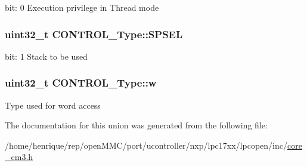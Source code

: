 bit\-: 0 Execution privilege in Thread mode \hypertarget{unionCONTROL__Type_a8cc085fea1c50a8bd9adea63931ee8e2}{
\subsubsection[{S\-P\-S\-E\-L}]{\setlength{\rightskip}{0pt plus 5cm}uint32\-\_\-t C\-O\-N\-T\-R\-O\-L\-\_\-\-Type\-::\-S\-P\-S\-E\-L}}\label{unionCONTROL__Type_a8cc085fea1c50a8bd9adea63931ee8e2}
bit\-: 1 Stack to be used \hypertarget{unionCONTROL__Type_a6b642cca3d96da660b1198c133ca2a1f}{
\subsubsection[{w}]{\setlength{\rightskip}{0pt plus 5cm}uint32\-\_\-t C\-O\-N\-T\-R\-O\-L\-\_\-\-Type\-::w}}\label{unionCONTROL__Type_a6b642cca3d96da660b1198c133ca2a1f}
Type used for word access 

The documentation for this union was generated from the following file\-:\begin{DoxyCompactItemize}
\item 
/home/henrique/rep/open\-M\-M\-C/port/ucontroller/nxp/lpc17xx/lpcopen/inc/\hyperlink{core__cm3_8h}{core\-\_\-cm3.\-h}\end{DoxyCompactItemize}
